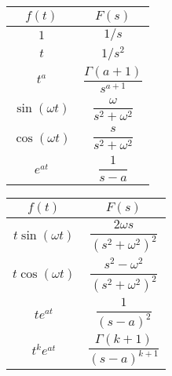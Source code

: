 \begin{center}
	\bgroup
	\def\arraystretch{2}
	\begin{tabular}{|c|c|} 
	\hline
	$f(t)$ & $F(s)$ \\
	\hline
	$1$ & $1/s$\\
	$t$ & $1/s^2$\\
	$t^a$ & $\dfrac{\Gamma(a + 1)}{s^{a + 1}}$\\
	$\sin(\omega t)$ & $\dfrac{\omega}{s^2 + \omega^2}$\\
	$\cos(\omega t)$ & $\dfrac{s}{s^2 + \omega^2}$\\
	$e^{at}$ & $\dfrac{1}{s - a}$\\
	\hline
	\end{tabular}
	\egroup
\end{center}
\begin{center}
	\bgroup
	\def\arraystretch{2}
	\begin{tabular}{|c|c|} 
	\hline
	$f(t)$ & $F(s)$ \\
	\hline
	$t\sin(\omega t)$ & $\dfrac{2\omega s}{(s^2 + \omega^2)^2}$\\
	$t\cos(\omega t)$ & $\dfrac{s^2 - \omega^2}{(s^2 + \omega^2)^2}$\\
	$te^{at}$ & $\dfrac{1}{(s - a)^2}$\\
	$t^ke^{at}$ & $\dfrac{\Gamma(k + 1)}{(s - a)^{k+1}}$ \\
	\hline
	\end{tabular}
	\egroup
\end{center}